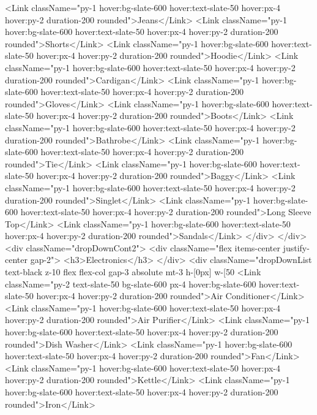         <Link className="py-1 hover:bg-slate-600 hover:text-slate-50 hover:px-4 hover:py-2 duration-200 rounded">Jeans</Link>
        <Link className="py-1 hover:bg-slate-600 hover:text-slate-50 hover:px-4 hover:py-2 duration-200 rounded">Shorts</Link>
        <Link className="py-1 hover:bg-slate-600 hover:text-slate-50 hover:px-4 hover:py-2 duration-200 rounded">Hoodie</Link>
        <Link className="py-1 hover:bg-slate-600 hover:text-slate-50 hover:px-4 hover:py-2 duration-200 rounded">Cardigan</Link>
        <Link className="py-1 hover:bg-slate-600 hover:text-slate-50 hover:px-4 hover:py-2 duration-200 rounded">Gloves</Link>
        <Link className="py-1 hover:bg-slate-600 hover:text-slate-50 hover:px-4 hover:py-2 duration-200 rounded">Boots</Link>
        <Link className="py-1 hover:bg-slate-600 hover:text-slate-50 hover:px-4 hover:py-2 duration-200 rounded">Bathrobe</Link>
        <Link className="py-1 hover:bg-slate-600 hover:text-slate-50 hover:px-4 hover:py-2 duration-200 rounded">Tie</Link>
        <Link className="py-1 hover:bg-slate-600 hover:text-slate-50 hover:px-4 hover:py-2 duration-200 rounded">Baggy</Link>
        <Link className="py-1 hover:bg-slate-600 hover:text-slate-50 hover:px-4 hover:py-2 duration-200 rounded">Singlet</Link>
        <Link className="py-1 hover:bg-slate-600 hover:text-slate-50 hover:px-4 hover:py-2 duration-200 rounded">Long Sleeve Top</Link>
        <Link className="py-1 hover:bg-slate-600 hover:text-slate-50 hover:px-4 hover:py-2 duration-200 rounded">Sandals</Link>
    </div>
</div>
<div className="dropDownCont2">
    <div className="flex items-center justify-center gap-2">
        <h3>Electronics</h3>
    </div>
    <div className="dropDownList text-black z-10 flex flex-col gap-3 absolute mt-3 h-[0px] w-[50%
        <Link className="py-2 text-slate-50 bg-slate-600 px-4 hover:bg-slate-600 hover:text-slate-50 hover:px-4 hover:py-2 duration-200 rounded">Air Conditioner</Link>
        <Link className="py-1 hover:bg-slate-600 hover:text-slate-50 hover:px-4 hover:py-2 duration-200 rounded">Air Purifier</Link>
        <Link className="py-1 hover:bg-slate-600 hover:text-slate-50 hover:px-4 hover:py-2 duration-200 rounded">Dish Washer</Link>
        <Link className="py-1 hover:bg-slate-600 hover:text-slate-50 hover:px-4 hover:py-2 duration-200 rounded">Fan</Link>
        <Link className="py-1 hover:bg-slate-600 hover:text-slate-50 hover:px-4 hover:py-2 duration-200 rounded">Kettle</Link>
        <Link className="py-1 hover:bg-slate-600 hover:text-slate-50 hover:px-4 hover:py-2 duration-200 rounded">Iron</Link>
